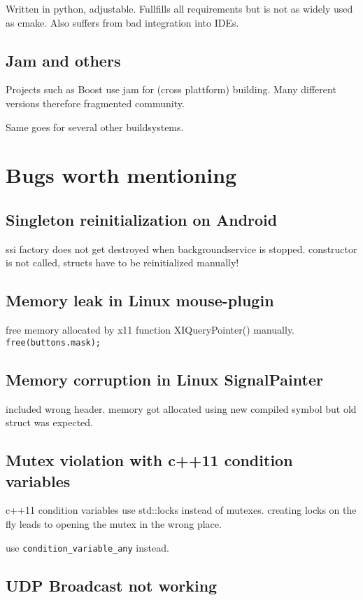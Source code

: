\documentclass[
10pt, %
a4paper, %
oneside, %
headinclude,footinclude, %
BCOR5mm, %
]{scrartcl}
\begin{document}
Written in python, adjustable.
Fullfills all requirements but is not as widely used as cmake.
Also suffers from bad integration into IDEs.

\subsection{Jam and others}

Projects such as Boost use jam for (cross plattform) building.
Many different versions therefore fragmented community.

Same goes for several other buildsystems.

\section{Bugs worth mentioning}

\subsection{Singleton reinitialization on Android}
ssi factory does not get destroyed when backgroundservice is stopped.
constructor is not called, structs have to be reinitialized manually!

\subsection{Memory leak in Linux mouse-plugin}

free memory allocated by x11 function XIQueryPointer() manually.
\verb|free(buttons.mask);|

\subsection{Memory corruption in Linux SignalPainter}

included wrong header.
memory got allocated using new compiled symbol but old struct was expected.

\subsection{Mutex violation with c++11 condition variables}

c++11 condition variables use std::locks instead of mutexes.
creating locks on the fly leads to opening the mutex in the wrong place.

use \verb|condition_variable_any| instead.


\subsection{UDP Broadcast not working}
\end{document}
